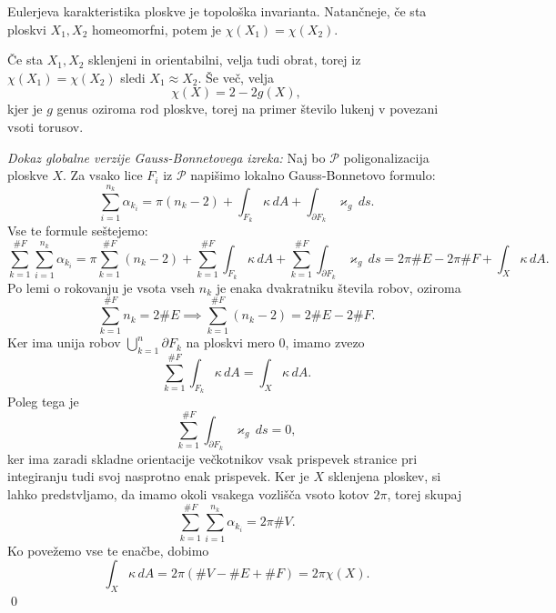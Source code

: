 \begin{izrek}
\label{izr_Eulerjeva_karakteristika_je_topoloska_invarianta}
Eulerjeva karakteristika ploskve je topološka invarianta. Natančneje, če sta ploskvi $X_1, X_2$ homeomorfni, potem 
je $\chi(X_1) = \chi(X_2)$. 
\end{izrek}

Če sta $X_1, X_2$ sklenjeni in orientabilni, velja tudi obrat, torej iz $\chi(X_1) = \chi(X_2)$ sledi $X_1 \approx X_2$. Še več, velja \begin{equation*}
\chi(X) = 2 - 2g(X),
\end{equation*}  
kjer je $g$ genus oziroma rod ploskve, torej na primer število lukenj v povezani vsoti torusov.

\noindent
{\em Dokaz globalne verzije Gauss-Bonnetovega izreka:\/}
Naj bo $\mathcal{P}$ poligonalizacija ploskve $X$. Za vsako lice $F_i$ iz $\mathcal{P}$ napišimo lokalno Gauss-Bonnetovo formulo:
\begin{equation*}
\sum_{i = 1}^{n_k} \alpha_{k_i} = \pi(n_k - 2) + \int_{F_k} \kappa \, dA + \int_{\partial F_k } \varkappa_g \, ds.  
\end{equation*}  
Vse te formule seštejemo: \begin{equation*}
\sum_{k = 1}^{\#F} \sum_{i = 1}^{n_k} \alpha_{k_i} = \pi \sum_{k = 1}^{\#F}  (n_k - 2) + \sum_{k = 1}^{\#F}  \int_{F_k} \kappa \, dA + \sum_{k = 1}^{\#F}  \int_{\partial F_k } \varkappa_g \, ds = 2 \pi \#E - 2\pi \# F + \int_{X} \kappa \, dA. 
\end{equation*}  
Po lemi o rokovanju je vsota vseh $n_k$ je enaka dvakratniku števila robov, oziroma \begin{equation*}
    \sum_{k = 1}^{\#F} n_k = 2 \# E \implies \sum_{k = 1}^{\#F}  (n_k - 2) = 2 \# E - 2 \# F.
\end{equation*}  
  Ker ima unija robov $\bigcup_{k = 1}^{n} \partial F_k$ na ploskvi mero $0$, imamo zvezo \begin{equation*}
    \sum_{k = 1}^{\#F}  \int_{F_k} \kappa \, dA = \int_{X} \kappa \, dA.  
  \end{equation*}  
Poleg tega je\begin{equation*}
    \sum_{k = 1}^{\#F} \int_{\partial F_k} \varkappa_g \, ds = 0, 
\end{equation*}  
ker ima zaradi skladne orientacije večkotnikov vsak prispevek stranice pri integiranju tudi svoj nasprotno enak prispevek. 
Ker je $X$ sklenjena ploskev, si lahko predstvljamo, da imamo okoli vsakega vozlišča vsoto kotov $2 \pi$, torej skupaj \begin{equation*}
    \sum_{k = 1}^{\#F} \sum_{i = 1}^{n_k} \alpha_{k_i} = 2 \pi \# V.
\end{equation*}  
Ko povežemo vse te enačbe, dobimo \begin{equation*}
\int_{X} \kappa \, dA = 2 \pi (\# V - \# E + \# F ) = 2 \pi \chi(X). 
\end{equation*} 
 \qed

